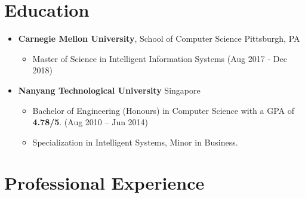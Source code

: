 
\section{Education}\label{education}

\begin{itemize}
\tightlist
\item
  \textbf{Carnegie Mellon University}, School of Computer Science
  \hfill Pittsburgh, PA

  \begin{itemize}
  \tightlist
  \item
    Master of Science in Intelligent Information Systems \hfill (Aug
    2017 - Dec 2018)
  \end{itemize}
\item
  \textbf{Nanyang Technological University} \hfill Singapore

  \begin{itemize}
  \tightlist
  \item
    Bachelor of Engineering (Honours) in Computer Science with a GPA of
    \textbf{4.78/5}. \hfill (Aug 2010 -- Jun 2014)
  \item
    Specialization in Intelligent Systems, Minor in Business.
  \end{itemize}
\end{itemize}

\section{Professional Experience}\label{professional-experience}

